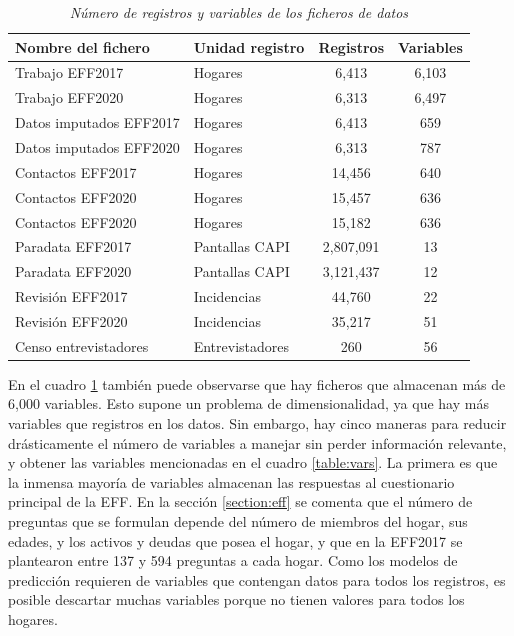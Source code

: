 \begin{table}[htbp]
\centering
\begin{tabular}{llcc}
\textbf{Nombre del fichero} & \textbf{Unidad registro} & \textbf{Registros} & \textbf{Variables} \\ \hline
Trabajo EFF2017 & Hogares & 6,413 & 6,103 \\
Trabajo EFF2020 & Hogares & 6,313 & 6,497 \\ \hline
Datos imputados EFF2017 & Hogares & 6,413 & 659 \\
Datos imputados EFF2020 & Hogares & 6,313 & 787 \\ \hline
Contactos EFF2017 & Hogares & 14,456 & 640 \\
Contactos EFF2020 & Hogares & 15,457 & 636 \\
Contactos EFF2020 & Hogares & 15,182 & 636 \\ \hline
Paradata EFF2017 & Pantallas CAPI & 2,807,091 & 13 \\
Paradata EFF2020 & Pantallas CAPI & 3,121,437 & 12 \\ \hline
Revisión EFF2017 & Incidencias & 44,760 & 22 \\
Revisión EFF2020 & Incidencias & 35,217 & 51 \\ \hline
Censo entrevistadores & Entrevistadores & 260 & 56 \\ \hline
\end{tabular}
\caption{\textit{Número de registros y variables de los ficheros de datos}}
\label{table:registers}
\end{table}

En el cuadro \ref{table:registers} también puede observarse que hay ficheros que almacenan más de 6,000 variables. Esto supone un problema de dimensionalidad, ya que hay más variables que registros en los datos. Sin embargo, hay cinco maneras para reducir drásticamente el número de variables a manejar sin perder información relevante, y obtener las variables mencionadas en el cuadro \ref{table:vars}. La primera es que la inmensa mayoría de variables almacenan las respuestas al cuestionario principal de la EFF. En la sección \ref{section:eff} se comenta que el número de preguntas que se formulan depende del número de miembros del hogar, sus edades, y los activos y deudas que posea el hogar, y que en la EFF2017 se plantearon entre 137 y 594 preguntas a cada hogar. Como los modelos de predicción requieren de variables que contengan datos para todos los registros, es posible descartar muchas variables porque no tienen valores para todos los hogares.

